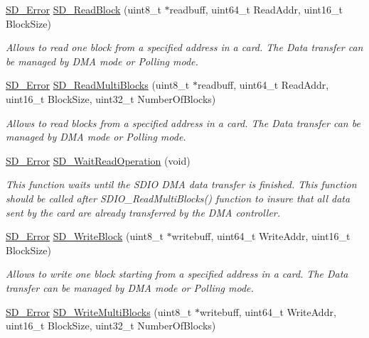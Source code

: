 \begin{DoxyCompactItemize}
\hyperlink{group__sd__card_gacff91fa68daa1d1ee967b5b3fb3dbd8c}{S\+D\+\_\+\+Error} \hyperlink{group__sd__card__private_ga1b2b4c1bf25da0771325b00cd638129d}{S\+D\+\_\+\+Read\+Block} (uint8\+\_\+t $\ast$readbuff, uint64\+\_\+t Read\+Addr, uint16\+\_\+t Block\+Size)
\begin{DoxyCompactList}\small\item\em Allows to read one block from a specified address in a card. The Data transfer can be managed by D\+MA mode or Polling mode. \end{DoxyCompactList}\item 
\hyperlink{group__sd__card_gacff91fa68daa1d1ee967b5b3fb3dbd8c}{S\+D\+\_\+\+Error} \hyperlink{group__sd__card__private_ga56b7336165f2631d9142a513ea2d0d17}{S\+D\+\_\+\+Read\+Multi\+Blocks} (uint8\+\_\+t $\ast$readbuff, uint64\+\_\+t Read\+Addr, uint16\+\_\+t Block\+Size, uint32\+\_\+t Number\+Of\+Blocks)
\begin{DoxyCompactList}\small\item\em Allows to read blocks from a specified address in a card. The Data transfer can be managed by D\+MA mode or Polling mode. \end{DoxyCompactList}\item 
\hyperlink{group__sd__card_gacff91fa68daa1d1ee967b5b3fb3dbd8c}{S\+D\+\_\+\+Error} \hyperlink{group__sd__card__private_ga42ab410b834d74d7f3ee757dc888b8cc}{S\+D\+\_\+\+Wait\+Read\+Operation} (void)
\begin{DoxyCompactList}\small\item\em This function waits until the S\+D\+IO D\+MA data transfer is finished. This function should be called after S\+D\+I\+O\+\_\+\+Read\+Multi\+Blocks() function to insure that all data sent by the card are already transferred by the D\+MA controller. \end{DoxyCompactList}\item 
\hyperlink{group__sd__card_gacff91fa68daa1d1ee967b5b3fb3dbd8c}{S\+D\+\_\+\+Error} \hyperlink{group__sd__card__private_gab1eef7c1ff23ea746db504463d301a8b}{S\+D\+\_\+\+Write\+Block} (uint8\+\_\+t $\ast$writebuff, uint64\+\_\+t Write\+Addr, uint16\+\_\+t Block\+Size)
\begin{DoxyCompactList}\small\item\em Allows to write one block starting from a specified address in a card. The Data transfer can be managed by D\+MA mode or Polling mode. \end{DoxyCompactList}\item 
\hyperlink{group__sd__card_gacff91fa68daa1d1ee967b5b3fb3dbd8c}{S\+D\+\_\+\+Error} \hyperlink{group__sd__card__private_ga64baac72a75a2c522e837935009cbe93}{S\+D\+\_\+\+Write\+Multi\+Blocks} (uint8\+\_\+t $\ast$writebuff, uint64\+\_\+t Write\+Addr, uint16\+\_\+t Block\+Size, uint32\+\_\+t Number\+Of\+Blocks)

\end{DoxyCompactItemize}
